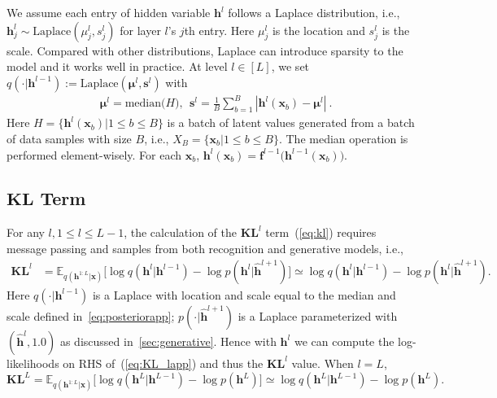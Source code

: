 \documentclass[twoside]{article}
\begin{document}
 We assume each entry of  hidden variable $\mathbf{h}^{l}$ follows a Laplace distribution, i.e., $\mathbf{h}_j^{l} \sim \text{Laplace}(\mu_j^{l}, s_j^{l})$ for layer $l$'s $j$th entry. Here $\mu_j^{l}$ is the location and $s_j^{l}$ is the scale. Compared with other distributions, Laplace can introduce sparsity to the model and it works well in practice. At level $l \in [L]$, we set $q(\cdot|\mathbf{h}^{l-1}) := \text{Laplace}(\mathbf{\mu}^l, \mathbf{s}^l)$ with
\begin{align}\label{eq:posteriorapp}
&\mathbf{\mu}^l = \text{median}\big(H\big), \ \  \mathbf{s}^l =\frac{1}{B}\sum_{b=1}^B|\mathbf{h}^l(\mathbf{x}_b) - \mathbf{\mu}^l| \ .
\end{align}
Here $H=\{\mathbf{h}^l(\mathbf{x}_b)| 1\leqslant b \leqslant B\}$ is a batch of latent values generated from a batch of data samples with size $B$, i.e., $X_{B} = \{\mathbf{x}_b | 1\leqslant b \leqslant B\}$. The median operation is performed element-wisely. For each $\mathbf{x}_b$, $\mathbf{h}^l(\mathbf{x}_b)=\mathbf{f}^{l-1}\big(\mathbf{h}^{l-1}(\mathbf{x}_b)\big)$.

\subsection{$\mathbf{KL}$ Term}
For any $l,  1 \leq l \leq L-1$, the calculation of the $\mathbf{KL}^l$ term~(\ref{eq:kl}) requires  message passing and samples  from both recognition and  generative models, i.e.,
\begin{align}\label{eq:KL_lapp}
\mathbf{KL}^l&=\mathbb{E}_{q(\mathbf{h}^{1:L}|\mathbf{x})}\big[  \log q(\mathbf{h}^{l}|\mathbf{h}^{l-1})   - \log p(\mathbf{h}^{l}|\widehat{\mathbf{h}}^{l+1}) \big] \simeq  \log q(\mathbf{h}^{l}|\mathbf{h}^{l-1})   - \log p(\mathbf{h}^{l}|\widehat{\mathbf{h}}^{l+1}).
\end{align} 
Here $q(\cdot|\mathbf{h}^{l-1})$ is a Laplace with location and scale equal to the median and scale defined in~\eqref{eq:posteriorapp}; $p(\cdot|\widehat{\mathbf{h}}^{l+1})$ is a  Laplace parameterized  with  $(\widehat{\mathbf{h}}^{l}, 1.0)$ as discussed in~\ref{sec:generative}. Hence with $\mathbf{h}^{l}$ we can compute the log-likelihoods on RHS of~(\ref{eq:KL_lapp}) and thus the $\mathbf{KL}^l$ value. When $l=L$, 
$\mathbf{KL}^L =  \mathbb{E}_{q(\mathbf{h}^{1:L}|\mathbf{x})}\big[  \log q(\mathbf{h}^{L}|\mathbf{h}^{L-1})- \log p(\mathbf{h}^{L})  \big] \simeq \log q(\mathbf{h}^{L}|\mathbf{h}^{L-1})- \log p(\mathbf{h}^{L}) .$
\end{document}
